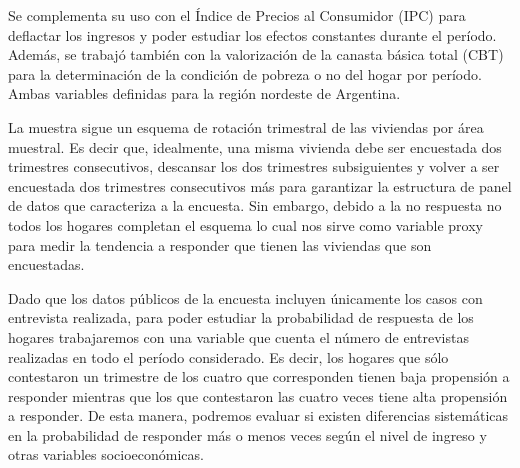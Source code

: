 \documentclass{article}
\begin{document}
Se complementa su uso con el Índice de Precios al Consumidor (IPC) para deflactar los ingresos y poder estudiar los efectos constantes durante el período. Además, se trabajó también con la valorización de la canasta básica total (CBT) para la determinación de la condición de pobreza o no del hogar por período. Ambas variables definidas para la región nordeste de Argentina.

La muestra sigue un esquema de rotación trimestral de las viviendas por área muestral. Es decir que, idealmente, una misma vivienda debe ser encuestada dos trimestres consecutivos, descansar los dos trimestres subsiguientes y volver a ser encuestada dos trimestres consecutivos más para garantizar la estructura de panel de datos que caracteriza a la encuesta. Sin embargo, debido a la no respuesta no todos los hogares completan el esquema lo cual nos sirve como variable proxy para medir la tendencia a responder que tienen las viviendas que son encuestadas.

Dado que los datos públicos de la encuesta incluyen únicamente los casos con entrevista realizada, para poder estudiar la probabilidad de respuesta de los hogares trabajaremos con una variable que cuenta el número de entrevistas realizadas en todo el período considerado. Es decir, los hogares que sólo contestaron un trimestre de los cuatro que corresponden tienen baja propensión a responder mientras que los que contestaron las cuatro veces tiene alta propensión a responder. De esta manera, podremos evaluar si existen diferencias sistemáticas en la probabilidad de responder más o menos veces según el nivel de ingreso y otras variables socioeconómicas.
\end{document}
